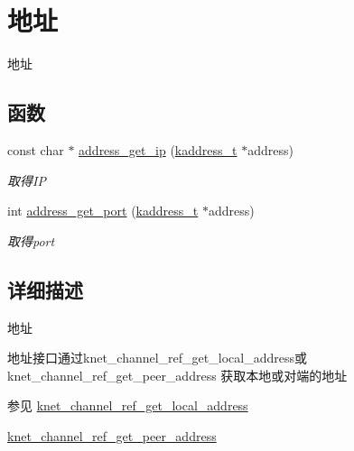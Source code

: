 \hypertarget{a00100}{}\section{地址}
\label{a00100}


地址  


\subsection*{函数}
\begin{DoxyCompactItemize}
\item 
const char $\ast$ \hyperlink{a00100_gaa1ea22192168bb6baea88feeb20eb601_gaa1ea22192168bb6baea88feeb20eb601}{address\+\_\+get\+\_\+ip} (\hyperlink{a00051_a44e99fab0348ec54cfee119ddd9ceed6_a44e99fab0348ec54cfee119ddd9ceed6}{kaddress\+\_\+t} $\ast$address)
\begin{DoxyCompactList}\small\item\em 取得\+I\+P \end{DoxyCompactList}\item 
int \hyperlink{a00100_ga9acaa00fe11bcecadea350baf9da7172_ga9acaa00fe11bcecadea350baf9da7172}{address\+\_\+get\+\_\+port} (\hyperlink{a00051_a44e99fab0348ec54cfee119ddd9ceed6_a44e99fab0348ec54cfee119ddd9ceed6}{kaddress\+\_\+t} $\ast$address)
\begin{DoxyCompactList}\small\item\em 取得port \end{DoxyCompactList}\end{DoxyCompactItemize}


\subsection{详细描述}
地址 


\begin{DoxyPre}
地址接口通过knet\_channel\_ref\_get\_local\_address或knet\_channel\_ref\_get\_peer\_address
获取本地或对端的地址
\end{DoxyPre}
 \begin{DoxySeeAlso}{参见}
\hyperlink{a00102_gaddc78bbbcee3974d351c2c1ec0340e3e_gaddc78bbbcee3974d351c2c1ec0340e3e}{knet\+\_\+channel\+\_\+ref\+\_\+get\+\_\+local\+\_\+address} 

\hyperlink{a00102_gac54b0999f21b2f481f7b8ebd17699655_gac54b0999f21b2f481f7b8ebd17699655}{knet\+\_\+channel\+\_\+ref\+\_\+get\+\_\+peer\+\_\+address} 
\end{DoxySeeAlso}


